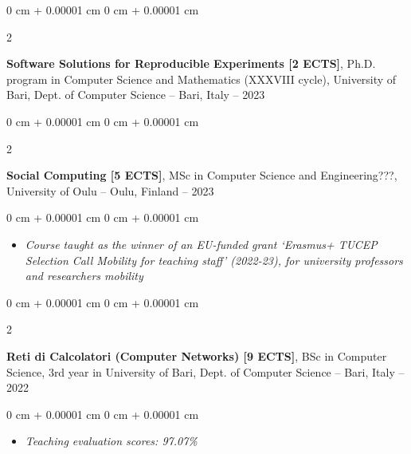 \documentclass[10pt, a4paper]{article}
\newenvironment{highlights}{
    \begin{itemize}[
        topsep=0.10 cm,
        parsep=0.10 cm,
        partopsep=0pt,
        itemsep=0pt,
        leftmargin=0 cm + 10pt
    ]
}{
    \end{itemize}
} %
\newenvironment{onecolentry}{
    \begin{adjustwidth}{
        0 cm + 0.00001 cm
    }{
        0 cm + 0.00001 cm
    }
}{
    \end{adjustwidth}
} %
\newenvironment{twocolentry}[2][]{
    \onecolentry
    \def\secondColumn{#2}
    \setcolumnwidth{\fill, 4.5 cm}
    \begin{paracol}{2}
}{
    \switchcolumn \raggedleft \secondColumn
    \end{paracol}
    \endonecolentry
} %
\begin{document}
        \vspace{0.2 cm}

        \begin{twocolentry}{
            2022 – 2023
        }
            \textbf{Software Solutions for Reproducible Experiments [2 ECTS]}, Ph.D. program in Computer Science and Mathematics (XXXVIII cycle), University of Bari, Dept. of Computer Science -- Bari, Italy\end{twocolentry}



        \vspace{0.2 cm}

        \begin{twocolentry}{
            2022 – 2023
        }
            \textbf{Social Computing [5 ECTS]}, MSc in Computer Science and Engineering???, University of Oulu -- Oulu, Finland\end{twocolentry}

        \vspace{0.10 cm}
        \begin{onecolentry}
            \begin{highlights}
                \item \textit{Course taught as the winner of an EU-funded grant `Erasmus+ TUCEP Selection Call Mobility for teaching staff' (2022-23), for university professors and researchers mobility}
            \end{highlights}
        \end{onecolentry}


        \vspace{0.2 cm}

        \begin{twocolentry}{
            2021 – 2022
        }
            \textbf{Reti di Calcolatori (Computer Networks) [9 ECTS]}, BSc in Computer Science, 3rd year in University of Bari, Dept. of Computer Science -- Bari, Italy\end{twocolentry}

        \vspace{0.10 cm}
        \begin{onecolentry}
            \begin{highlights}
                \item \textit{Teaching evaluation scores: 97.07\%}
            \end{highlights}
        \end{onecolentry}


        \vspace{0.2 cm}
\end{document}

